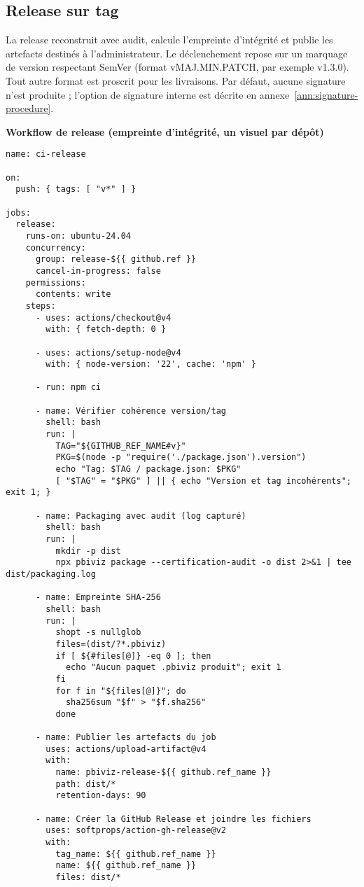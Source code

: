 \subsection{Release sur tag}
\label{subsec:ci-release}

La release reconstruit avec audit, calcule l’empreinte d’intégrité et publie les artefacts destinés à l’administrateur. Le déclenchement repose sur un marquage de version respectant SemVer (format vMAJ.MIN.PATCH, par exemple v1.3.0). Tout autre format est proscrit pour les livraisons. Par défaut, aucune signature n’est produite ; l’option de signature interne est décrite en annexe~\ref{ann:signature-procedure}.

\noindent\textbf{Workflow de release (empreinte d’intégrité, un visuel par dépôt)}
\begin{verbatim}
name: ci-release

on:
  push: { tags: [ "v*" ] }

jobs:
  release:
    runs-on: ubuntu-24.04
    concurrency:
      group: release-${{ github.ref }}
      cancel-in-progress: false
    permissions:
      contents: write
    steps:
      - uses: actions/checkout@v4
        with: { fetch-depth: 0 }

      - uses: actions/setup-node@v4
        with: { node-version: '22', cache: 'npm' }

      - run: npm ci

      - name: Vérifier cohérence version/tag
        shell: bash
        run: |
          TAG="${GITHUB_REF_NAME#v}"
          PKG=$(node -p "require('./package.json').version")
          echo "Tag: $TAG / package.json: $PKG"
          [ "$TAG" = "$PKG" ] || { echo "Version et tag incohérents"; exit 1; }

      - name: Packaging avec audit (log capturé)
        shell: bash
        run: |
          mkdir -p dist
          npx pbiviz package --certification-audit -o dist 2>&1 | tee dist/packaging.log

      - name: Empreinte SHA-256
        shell: bash
        run: |
          shopt -s nullglob
          files=(dist/?*.pbiviz)
          if [ ${#files[@]} -eq 0 ]; then
            echo "Aucun paquet .pbiviz produit"; exit 1
          fi
          for f in "${files[@]}"; do
            sha256sum "$f" > "$f.sha256"
          done

      - name: Publier les artefacts du job
        uses: actions/upload-artifact@v4
        with:
          name: pbiviz-release-${{ github.ref_name }}
          path: dist/*
          retention-days: 90

      - name: Créer la GitHub Release et joindre les fichiers
        uses: softprops/action-gh-release@v2
        with:
          tag_name: ${{ github.ref_name }}
          name: ${{ github.ref_name }}
          files: dist/*
\end{verbatim}

